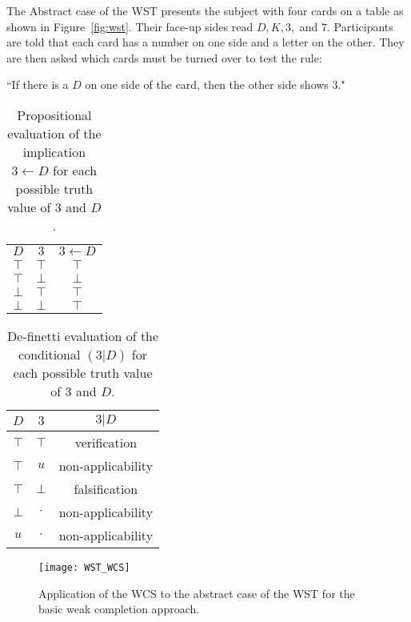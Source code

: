 The Abstract case of the WST presents the subject with four cards on a table as shown in Figure~\ref{fig:wst}. Their face-up sides read $D, K, 3,$ and $7$. Participants are told that each card has a number on one side and a letter on the other. They are then asked which cards must be turned over to test the rule:

\begin{center}
``If there is a $D$ on one side of the card, then the other side shows $3$."
\end{center} 

\begin{table}
\begin{center}


\begin{tabular}{ c c c}
  \textbf{$D$}&  \textbf{$3$}& \textbf{$3\leftarrow D$} \\ 
 $\top$ & $\top$ & $\top$\\  
 $\top$ & $\bot$ & $\bot$\\  
 $\bot$ & $\top$ & $\top$\\
 $\bot$ & $\bot$ & $\top$
\end{tabular}
\caption{Propositional evaluation of the implication $3 \leftarrow D$ for each possible truth value of $3$ and $D$.}
\label{tbl:wst_impl}
\end{center}
\end{table}

\begin{table}
\begin{center}


\begin{tabular}{ c c c}
  \textbf{$D$}&  \textbf{$3$}& \textbf{$3|D$} \\ 
  \hline
 $\top$ & $\top$ & verification\\  
  $\top$ & $u$ & non-applicability\\ 
 $\top$ & $\bot$ & falsification\\  
 $\bot$ & $\cdot$ & non-applicability\\
 $u$ & $\cdot$ & non-applicability
\end{tabular}
\caption{De-finetti evaluation of the conditional $(3|D)$ for each possible truth value of $3$ and $D$.}
\label{tbl:wst_classical}
\end{center}
\end{table}

\begin{figure}
\centering \texttt{[image: WST\_WCS]}
\caption{Application of the WCS to the abstract case of the WST for the basic weak completion approach.}
\label{wst_wcs}
\end{figure}

